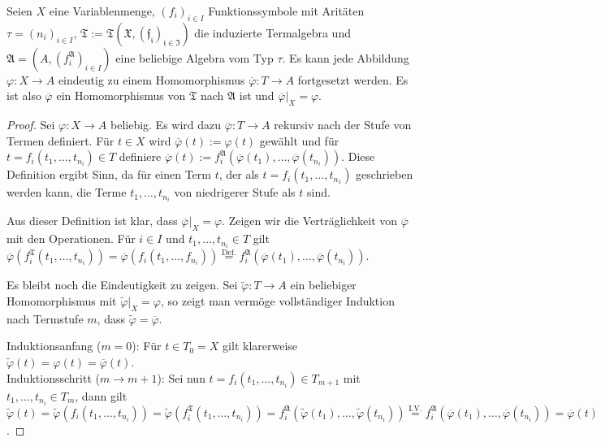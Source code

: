 \begin{theorem}
    Seien $X$ eine Variablenmenge, $(f_i)_{i \in I}$ Funktionssymbole mit Aritäten $\tau = (n_i)_{i \in I}$, $\mathfrak{T} := \mathfrak{T(X, (f_i)_{i \in I})}$ die induzierte Termalgebra und $\mathfrak{A} = (A, (f_i^\mathfrak{A})_{i \in I})$ eine beliebige Algebra vom Typ $\tau$.
    Es kann jede Abbildung $\varphi: X \to A$ eindeutig zu einem Homomorphismus $\overline{\varphi}: T \to A$ fortgesetzt werden. Es ist also  $\overline{\varphi}$ ein Homomorphismus von $\mathfrak{T}$ nach $\mathfrak{A}$ ist und $\overline{\varphi}\vert_X = \varphi$.
\end{theorem}
\begin{proof}
    Sei $\varphi: X \to A$ beliebig. Es wird dazu $\overline{\varphi}: T \to A$ rekursiv nach der Stufe von Termen definiert. Für $t \in X$ wird $\overline{\varphi}(t) := \varphi(t)$ gewählt und für $t = f_i(t_1, \ldots, t_{n_i}) \in T$ definiere $\overline{\varphi}(t) := f_i^\mathfrak{A}(\overline{\varphi}(t_1), \ldots, \overline{\varphi}(t_{n_i}))$. Diese Definition ergibt Sinn, da für einen Term $t$, der als $t = f_i(t_1, \ldots, t_{n_1})$ geschrieben werden kann, die Terme $t_1, \ldots, t_{n_i}$ von niedrigerer Stufe als $t$ sind.

    Aus dieser Definition ist klar, dass $\overline{\varphi} \vert_X = \varphi$. Zeigen wir die Verträglichkeit von $\overline{\varphi}$ mit den Operationen. Für $i \in I$ und $t_1, \ldots, t_{n_i} \in T$ gilt $\overline{\varphi}(f_i^\mathfrak{T}(t_1, \ldots, t_{n_i})) = \overline{\varphi}(f_i(t_1, \ldots, f_{n_i})) \overset{\text{Def.}}{=} f_i^\mathfrak{A}(\overline{\varphi}(t_1), \ldots, \overline{\varphi}(t_{n_i}))$. 

    Es bleibt noch die Eindeutigkeit zu zeigen. Sei $\widetilde{\varphi}: T \to A$ ein beliebiger Homomorphismus mit $\widetilde{\varphi}\vert_X = \varphi$, so zeigt man vermöge vollständiger Induktion nach Termstufe $m$, dass $\widetilde{\varphi} = \overline{\varphi}$. 
    
    Induktionsanfang ($m=0$): Für $t \in T_{0} = X$ gilt klarerweise $\widetilde{\varphi}(t) = \varphi(t) = \overline{\varphi}(t)$.\\
    Induktionsschritt ($m \to m+1$): Sei nun $t = f_i(t_{1}, \ldots, t_{n_i}) \in T_{m+1}$ mit $t_1, \ldots, t_{n_i} \in T_{m}$, dann gilt $\widetilde{\varphi}(t) = \widetilde{\varphi}(f_i(t_1, \ldots, t_{n_i})) = \widetilde{\varphi}(f_i^\mathfrak{T}(t_1, \ldots, t_{n_i})) = f_i^\mathfrak{A}(\widetilde{\varphi}(t_1), \ldots, \widetilde{\varphi}(t_{n_i})) \overset{\text{I.V.}}{=} f_i^\mathfrak{A}(\overline{\varphi}(t_1), \ldots, \overline{\varphi}(t_{n_i})) = \overline{\varphi}(t) $.
\end{proof}

